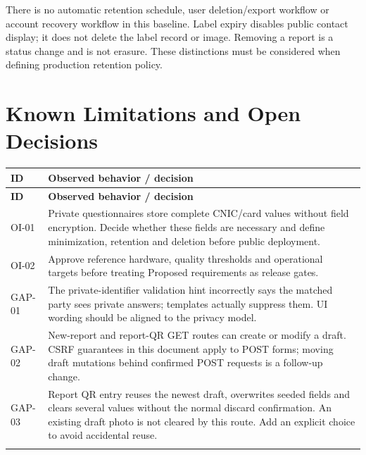 \documentclass[12pt,a4paper,oneside]{report}
\begin{document}
There is no automatic retention schedule, user deletion/export workflow or account recovery workflow in this baseline. Label expiry disables public contact display; it does not delete the label record or image. Removing a report is a status change and is not erasure. These distinctions must be considered when defining production retention policy.


\section{Known Limitations and Open Decisions}

\begin{longtable}{@{}P{0.15\dimexpr\textwidth-12pt\relax}P{0.85\dimexpr\textwidth-12pt\relax}@{}}

\toprule \textbf{ID} & \textbf{Observed behavior / decision} \\ \midrule\endfirsthead

\toprule \textbf{ID} & \textbf{Observed behavior / decision} \\ \midrule\endhead

\bottomrule\endfoot

OI-01 & Private questionnaires store complete CNIC/card values without field encryption. Decide whether these fields are necessary and define minimization, retention and deletion before public deployment. \\ \addlinespace[3pt]

OI-02 & Approve reference hardware, quality thresholds and operational targets before treating Proposed requirements as release gates. \\ \addlinespace[3pt]

GAP-01 & The private-identifier validation hint incorrectly says the matched party sees private answers; templates actually suppress them. UI wording should be aligned to the privacy model. \\ \addlinespace[3pt]

GAP-02 & New-report and report-QR GET routes can create or modify a draft. CSRF guarantees in this document apply to POST forms; moving draft mutations behind confirmed POST requests is a follow-up change. \\ \addlinespace[3pt]

GAP-03 & Report QR entry reuses the newest draft, overwrites seeded fields and clears several values without the normal discard confirmation. An existing draft photo is not cleared by this route. Add an explicit choice to avoid accidental reuse. \\ \addlinespace[3pt]


\end{longtable}
\end{document}
